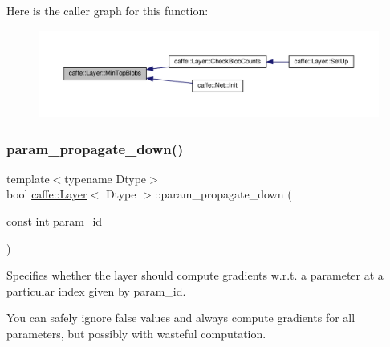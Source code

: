 Here is the caller graph for this function\+:
\nopagebreak
\begin{figure}[H]
\begin{center}
\leavevmode
\includegraphics[width=350pt]{classcaffe_1_1_layer_ab9e4c8d642e413948b131d851a8462a4_icgraph}
\end{center}
\end{figure}
\mbox{\label{classcaffe_1_1_layer_a1a3708013b0231e71d725252e10ce6e3}} 
\subsubsection{\texorpdfstring{param\+\_\+propagate\+\_\+down()}{param\_propagate\_down()}\hspace{0.1cm}{\footnotesize\ttfamily [1/2]}}
{\footnotesize\ttfamily template$<$typename Dtype$>$ \\
bool \mbox{\hyperlink{classcaffe_1_1_layer}{caffe\+::\+Layer}}$<$ Dtype $>$\+::param\+\_\+propagate\+\_\+down (\begin{DoxyParamCaption}\item[{const int}]{param\+\_\+id }\end{DoxyParamCaption})\hspace{0.3cm}{\ttfamily [inline]}}



Specifies whether the layer should compute gradients w.\+r.\+t. a parameter at a particular index given by param\+\_\+id. 

You can safely ignore false values and always compute gradients for all parameters, but possibly with wasteful computation. \mbox{\label{classcaffe_1_1_layer_a1a3708013b0231e71d725252e10ce6e3}} 
